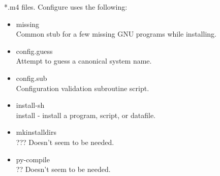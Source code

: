 \documentclass[11pt]{article}
\begin{document}
\begin{itemize}
*.m4 files.
Configure uses the following:
\begin{itemize}
\item  missing \\
Common stub for a few missing GNU programs while installing.
\item  config.guess \\
Attempt to guess a canonical system name.
\item  config.sub\\
Configuration validation subroutine script.
\item  install-sh \\
install - install a program, script, or datafile.
\item   mkinstalldirs\\ ???
Doesn't seem to be needed.
\item   py-compile\\ ??
Doesn't seem to be needed.
\end{itemize}
\end{itemize}
\end{document}
